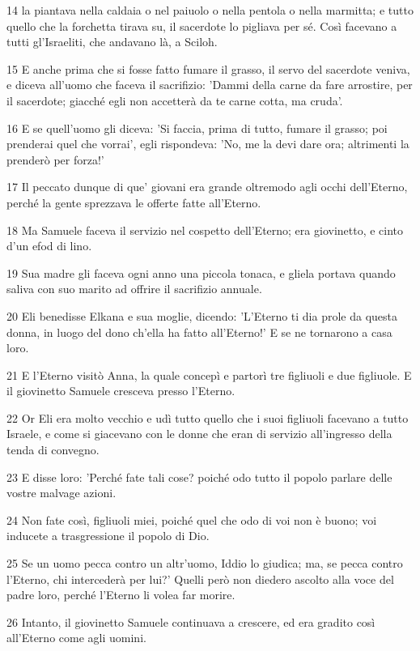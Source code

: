 \par 14 la piantava nella caldaia o nel paiuolo o nella pentola o nella marmitta; e tutto quello che la forchetta tirava su, il sacerdote lo pigliava per sé. Così facevano a tutti gl'Israeliti, che andavano là, a Sciloh.
\par 15 E anche prima che si fosse fatto fumare il grasso, il servo del sacerdote veniva, e diceva all'uomo che faceva il sacrifizio: 'Dammi della carne da fare arrostire, per il sacerdote; giacché egli non accetterà da te carne cotta, ma cruda'.
\par 16 E se quell'uomo gli diceva: 'Si faccia, prima di tutto, fumare il grasso; poi prenderai quel che vorrai', egli rispondeva: 'No, me la devi dare ora; altrimenti la prenderò per forza!'
\par 17 Il peccato dunque di que' giovani era grande oltremodo agli occhi dell'Eterno, perché la gente sprezzava le offerte fatte all'Eterno.
\par 18 Ma Samuele faceva il servizio nel cospetto dell'Eterno; era giovinetto, e cinto d'un efod di lino.
\par 19 Sua madre gli faceva ogni anno una piccola tonaca, e gliela portava quando saliva con suo marito ad offrire il sacrifizio annuale.
\par 20 Eli benedisse Elkana e sua moglie, dicendo: 'L'Eterno ti dia prole da questa donna, in luogo del dono ch'ella ha fatto all'Eterno!' E se ne tornarono a casa loro.
\par 21 E l'Eterno visitò Anna, la quale concepì e partorì tre figliuoli e due figliuole. E il giovinetto Samuele cresceva presso l'Eterno.
\par 22 Or Eli era molto vecchio e udì tutto quello che i suoi figliuoli facevano a tutto Israele, e come si giacevano con le donne che eran di servizio all'ingresso della tenda di convegno.
\par 23 E disse loro: 'Perché fate tali cose? poiché odo tutto il popolo parlare delle vostre malvage azioni.
\par 24 Non fate così, figliuoli miei, poiché quel che odo di voi non è buono; voi inducete a trasgressione il popolo di Dio.
\par 25 Se un uomo pecca contro un altr'uomo, Iddio lo giudica; ma, se pecca contro l'Eterno, chi intercederà per lui?' Quelli però non diedero ascolto alla voce del padre loro, perché l'Eterno li volea far morire.
\par 26 Intanto, il giovinetto Samuele continuava a crescere, ed era gradito così all'Eterno come agli uomini.
